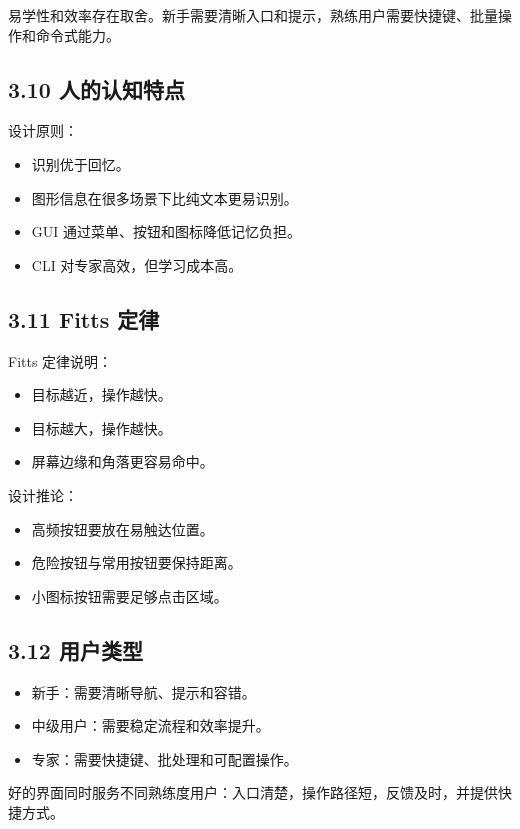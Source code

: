 \documentclass[UTF8,zihao=-4]{ctexart}
\begin{document}
易学性和效率存在取舍。新手需要清晰入口和提示，熟练用户需要快捷键、批量操作和命令式能力。

\subsection{3.10 人的认知特点}

设计原则：

\begin{itemize}
\item 识别优于回忆。
\item 图形信息在很多场景下比纯文本更易识别。
\item GUI 通过菜单、按钮和图标降低记忆负担。
\item CLI 对专家高效，但学习成本高。
\end{itemize}

\subsection{3.11 Fitts 定律}

Fitts 定律说明：

\begin{itemize}
\item 目标越近，操作越快。
\item 目标越大，操作越快。
\item 屏幕边缘和角落更容易命中。
\end{itemize}

设计推论：

\begin{itemize}
\item 高频按钮要放在易触达位置。
\item 危险按钮与常用按钮要保持距离。
\item 小图标按钮需要足够点击区域。
\end{itemize}

\subsection{3.12 用户类型}

\begin{itemize}
\item 新手：需要清晰导航、提示和容错。
\item 中级用户：需要稳定流程和效率提升。
\item 专家：需要快捷键、批处理和可配置操作。
\end{itemize}

好的界面同时服务不同熟练度用户：入口清楚，操作路径短，反馈及时，并提供快捷方式。
\end{document}
